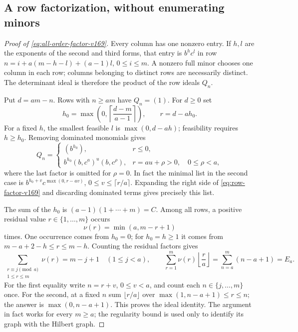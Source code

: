 \subsection{A row factorization, without enumerating minors}
\begin{proof}[Proof of \eqref{eq:all-order-factor-v169}]
Every column has one nonzero entry. If $h,l$ are the exponents of the
second and third forms, that entry is $b^hc^l$ in row
$n=i+a(m-h-l)+(a-1)l$, $0\leq i\leq m$. A nonzero full minor chooses
one column in each row; columns belonging to distinct rows are
necessarily distinct. The determinant ideal is therefore the product
of the row ideals $Q_n$.

Put $d=am-n$. Rows with $n\geq am$ have $Q_n=(1)$. For $d\geq0$ set
\[
 h_0=\max\left(0,\left\lceil\frac{d-m}{a-1}\right\rceil\right),
 \qquad r=d-ah_0.
\]
For a fixed $h$, the smallest feasible $l$ is $\max(0,d-ah)$;
feasibility requires $h\geq h_0$. Removing dominated monomials gives
\begin{equation}\label{eq:row-factor-v169}
 Q_n=
 \begin{cases}
 (b^{h_0}),&r\leq0,\\
 b^{h_0}(b,c^a)^u(b,c^\rho),&r=au+\rho>0,\quad0\leq\rho<a,
 \end{cases}
\end{equation}
where the last factor is omitted for $\rho=0$. In fact the minimal
list in the second case is
$b^{h_0+v}c^{\max(0,r-av)}$, $0\leq v\leq\lceil r/a\rceil$.
Expanding the right side of \eqref{eq:row-factor-v169} and discarding
dominated terms gives precisely this list.

The sum of the $h_0$ is
$(a-1)(1+\cdots+m)=C$. Among all rows, a positive residual value
$r\in\{1,\ldots,m\}$ occurs
\[
 \nu(r)=\min(a,m-r+1)
\]
times. One occurrence comes from $h_0=0$; for $h_0=h\geq1$ it comes
from $m-a+2-h\leq r\leq m-h$. Counting the residual factors gives
\[
 \sum_{\substack{r\equiv j\pmod a\\1\leq r\leq m}}\nu(r)=m-j+1
 \quad(1\leq j<a),
 \qquad
 \sum_{r=1}^m\nu(r)\left\lfloor\frac ra\right\rfloor
       =\sum_{n=a}^m(n-a+1)=E_a.
\]
For the first equality write $n=r+v$, $0\leq v<a$, and count each
$n\in\{j,\ldots,m\}$ once. For the second, at a fixed $n$ sum
$\lfloor r/a\rfloor$ over
$\max(1,n-a+1)\leq r\leq n$; the answer is $\max(0,n-a+1)$.
This proves the ideal identity. The argument in fact works for every
$m\geq a$; the regularity bound is used only to identify its graph
with the Hilbert graph.
\end{proof}

